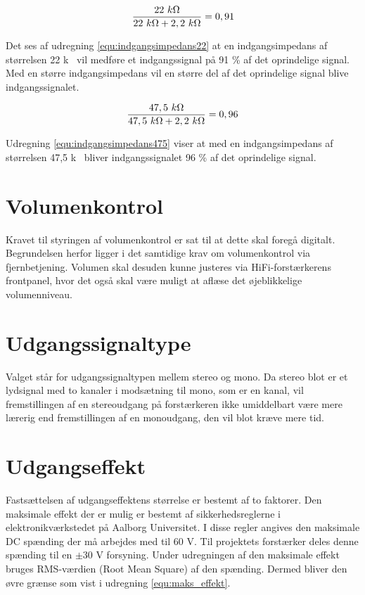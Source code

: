 \begin{equation}
\label{equ:indgangsimpedans22}
\frac{22~k\ohm}{22~k\ohm + 2,2~k\ohm} = 0,91
\end{equation}

Det ses af udregning \ref{equ:indgangsimpedans22} at en indgangsimpedans af størrelsen 22 k\ohm~ vil medføre et indgangssignal på 91 \% af det oprindelige signal. Med en større indgangsimpedans vil en større del af det oprindelige signal blive indgangssignalet. 

\begin{equation}
\label{equ:indgangsimpedans475}
\frac{47,5~k\ohm}{47,5~k\ohm + 2,2~k\ohm} = 0,96
\end{equation}

Udregning \ref{equ:indgangsimpedans475} viser at med en indgangsimpedans af størrelsen 47,5 k\ohm~ bliver indgangssignalet 96 \% af det oprindelige signal.

\section{Volumenkontrol}
\label{krav_volumenkontrol}
Kravet til styringen af volumenkontrol er sat til at dette skal foregå digitalt. Begrundelsen herfor ligger i det samtidige krav om volumenkontrol via fjernbetjening. Volumen skal desuden kunne justeres via HiFi-forstærkerens frontpanel, hvor det også skal være muligt at aflæse det øjeblikkelige volumenniveau.  

\section{Udgangssignaltype}
\label{krav_udgangssignaltype}
Valget står for udgangssignaltypen mellem stereo og mono. Da stereo blot er et lydsignal med to kanaler i modsætning til mono, som er en kanal, vil fremstillingen af en stereoudgang på forstærkeren ikke umiddelbart være mere lærerig end fremstillingen af en monoudgang, den vil blot kræve mere tid. 

\section{Udgangseffekt}
\label{krav_udgangseffekt}
Fastsættelsen af udgangseffektens størrelse er bestemt af to faktorer. Den maksimale effekt der er mulig er bestemt af sikkerhedsreglerne i elektronikværkstedet på Aalborg Universitet. I disse regler angives den maksimale DC spænding der må arbejdes med til 60 V. \cite{elregler-b1101}%
Til projektets forstærker deles denne spænding til en $\pm$30 V forsyning. Under udregningen af den maksimale effekt bruges RMS-værdien (Root Mean Square) af den spænding. Dermed bliver den øvre grænse som vist i udregning \ref{equ:maks_effekt}.

